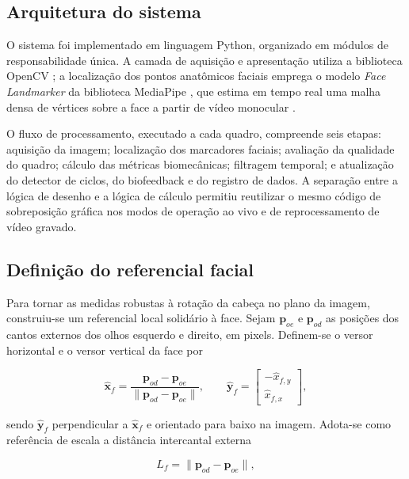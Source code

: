 \documentclass[
    article,
    11pt,
    oneside,
    a4paper,
    english,
    brazil
]{abntex2}
\begin{document}
\subsection{Arquitetura do sistema}

O sistema foi implementado em linguagem Python, organizado em módulos de
responsabilidade única. A camada de aquisição e apresentação utiliza a
biblioteca OpenCV \cite{bradski2000}; a localização dos pontos anatômicos
faciais emprega o modelo \textit{Face Landmarker} da biblioteca MediaPipe
\cite{lugaresi2019}, que estima em tempo real uma malha densa de vértices
sobre a face a partir de vídeo monocular \cite{kartynnik2019}.

O fluxo de processamento, executado a cada quadro, compreende seis etapas:
aquisição da imagem; localização dos marcadores faciais; avaliação da
qualidade do quadro; cálculo das métricas biomecânicas; filtragem temporal;
e atualização do detector de ciclos, do biofeedback e do registro de dados.
A separação entre a lógica de desenho e a lógica de cálculo permitiu
reutilizar o mesmo código de sobreposição gráfica nos modos de operação ao
vivo e de reprocessamento de vídeo gravado.

\subsection{Definição do referencial facial}

Para tornar as medidas robustas à rotação da cabeça no plano da imagem,
construiu-se um referencial local solidário à face. Sejam
$\mathbf{p}_{oe}$ e $\mathbf{p}_{od}$ as posições dos cantos externos dos
olhos esquerdo e direito, em pixels. Definem-se o versor horizontal e o
versor vertical da face por

\begin{equation}
    \hat{\mathbf{x}}_{f} =
        \frac{\mathbf{p}_{od} - \mathbf{p}_{oe}}
             {\lVert \mathbf{p}_{od} - \mathbf{p}_{oe} \rVert},
    \qquad
    \hat{\mathbf{y}}_{f} =
        \begin{bmatrix} -\hat{x}_{f,y} \\ \hat{x}_{f,x} \end{bmatrix},
    \label{eq:referencial}
\end{equation}

\noindent
sendo $\hat{\mathbf{y}}_{f}$ perpendicular a $\hat{\mathbf{x}}_{f}$ e
orientado para baixo na imagem. Adota-se como referência de escala a
distância intercantal externa

\begin{equation}
    L_{f} = \lVert \mathbf{p}_{od} - \mathbf{p}_{oe} \rVert ,
    \label{eq:largura}
\end{equation}
\end{document}
